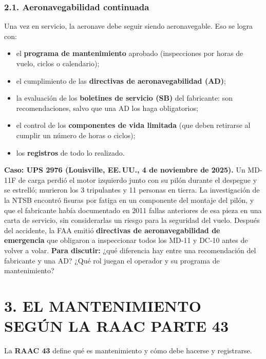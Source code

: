 \subsubsection*{2.1. Aeronavegabilidad continuada}
Una vez en servicio, la aeronave debe seguir siendo aeronavegable. Eso se logra con:
\begin{itemize}
  \item el \textbf{programa de mantenimiento} aprobado (inspecciones por horas de vuelo, ciclos o
        calendario);
  \item el cumplimiento de las \textbf{directivas de aeronavegabilidad (AD)};
  \item la evaluación de los \textbf{boletines de servicio (SB)} del fabricante: son
        recomendaciones, salvo que una AD los haga obligatorios;
  \item el control de los \textbf{componentes de vida limitada} (que deben retirarse al cumplir
        un número de horas o ciclos);
  \item los \textbf{registros} de todo lo realizado.
\end{itemize}

\begin{recuadro}
\textbf{Caso: UPS 2976 (Louisville, EE.\,UU., 4 de noviembre de 2025).} Un MD-11F de carga
perdió el motor izquierdo junto con su pilón durante el despegue y se estrelló; murieron los 3
tripulantes y 11 personas en tierra. La investigación de la NTSB encontró fisuras por fatiga en
un componente del montaje del pilón, y que el fabricante había documentado en 2011 fallas
anteriores de esa pieza en una carta de servicio, sin considerarlas un riesgo para la seguridad
del vuelo. Después del accidente, la FAA emitió \textbf{directivas de aeronavegabilidad de
emergencia} que obligaron a inspeccionar todos los MD-11 y DC-10 antes de volver a volar.
\textbf{Para discutir:} ¿qué diferencia hay entre una recomendación del fabricante y una AD? ¿Qué
rol juegan el operador y su programa de mantenimiento?
\end{recuadro}

\section*{3. EL MANTENIMIENTO SEGÚN LA RAAC PARTE 43}

La \textbf{RAAC 43} define qué es mantenimiento y cómo debe hacerse y registrarse.

